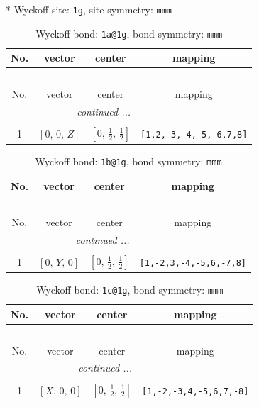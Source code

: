 \documentclass[fleqn,8pt]{jsarticle}
\begin{document}
* Wyckoff site: {\tt 1g}, site symmetry: {\tt mmm}
\renewcommand{\arraystretch}{1.2}
\begin{longtable}{cccc}
\caption{Wyckoff bond: {\tt 1a@1g}, bond symmetry: {\tt mmm}}
 \\
 \hline \hline
No. & vector & center & mapping \\ \hline \endfirsthead

\multicolumn{3}{l}{\tablename\ \thetable{}} \\
 \hline \hline
No. & vector & center & mapping \\ \hline \endhead

 \hline \hline
\multicolumn{3}{r}{\footnotesize\it continued ...} \\ \endfoot

 \hline \hline
\multicolumn{3}{r}{} \\ \endlastfoot

1 & $\left[ 0,\, 0,\, Z \right]$ & $\left[ 0,\, \frac{1}{2},\, \frac{1}{2} \right]$ & {\tt [1,2,-3,-4,-5,-6,7,8]} \\
\end{longtable}
\renewcommand{\arraystretch}{1.2}
\begin{longtable}{cccc}
\caption{Wyckoff bond: {\tt 1b@1g}, bond symmetry: {\tt mmm}}
 \\
 \hline \hline
No. & vector & center & mapping \\ \hline \endfirsthead

\multicolumn{3}{l}{\tablename\ \thetable{}} \\
 \hline \hline
No. & vector & center & mapping \\ \hline \endhead

 \hline \hline
\multicolumn{3}{r}{\footnotesize\it continued ...} \\ \endfoot

 \hline \hline
\multicolumn{3}{r}{} \\ \endlastfoot

1 & $\left[ 0,\, Y,\, 0 \right]$ & $\left[ 0,\, \frac{1}{2},\, \frac{1}{2} \right]$ & {\tt [1,-2,3,-4,-5,6,-7,8]} \\
\end{longtable}
\renewcommand{\arraystretch}{1.2}
\begin{longtable}{cccc}
\caption{Wyckoff bond: {\tt 1c@1g}, bond symmetry: {\tt mmm}}
 \\
 \hline \hline
No. & vector & center & mapping \\ \hline \endfirsthead

\multicolumn{3}{l}{\tablename\ \thetable{}} \\
 \hline \hline
No. & vector & center & mapping \\ \hline \endhead

 \hline \hline
\multicolumn{3}{r}{\footnotesize\it continued ...} \\ \endfoot

 \hline \hline
\multicolumn{3}{r}{} \\ \endlastfoot

1 & $\left[ X,\, 0,\, 0 \right]$ & $\left[ 0,\, \frac{1}{2},\, \frac{1}{2} \right]$ & {\tt [1,-2,-3,4,-5,6,7,-8]} \\
\end{longtable}
\end{document}
